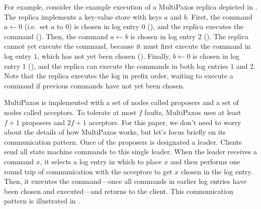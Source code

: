 For example, consider the example execution of a MultiPaxos replica depicted in
. The replica implements a key-value store
with keys $a$ and $b$. First, the command $a \gets 0$ (i.e.\ set $a$ to $0$) is
chosen in log entry $0$ (), and the replica
executes the command (). Then, the command
$a \gets b$ is chosen in log entry $2$ ().
The replica cannot yet execute the command, because it must first execute the
command in log entry $1$, which has not yet been chosen
().  Finally, $b \gets 0$ is chosen in log
entry $1$ (), and the replica can execute
the commands in both log entries $1$ and $2$. Note that the replica executes
the log in prefix order, waiting to execute a command if previous commands have
not yet been chosen.

{}

MultiPaxos is implemented with a set of nodes called proposers and a set of
nodes called acceptors. To tolerate at most $f$ faults, MultiPaxos uses at
least $f+1$ proposers and $2f+1$ acceptors. For this paper, we don't need to
worry about the details of how MultiPaxos works, but let's focus briefly on its
communication pattern. Once of the proposers is designated a leader. Clients
send all state machine commands to this single leader. When the leader receives
a command $x$, it selects a log entry in which to place $x$ and then performs
one round trip of communication with the acceptors to get $x$ chosen in the log
entry. Then, it executes the command---once all commands in earlier log entries
have been chosen and executed---and returns to the client.  This communication
pattern is illustrated in .

{}
